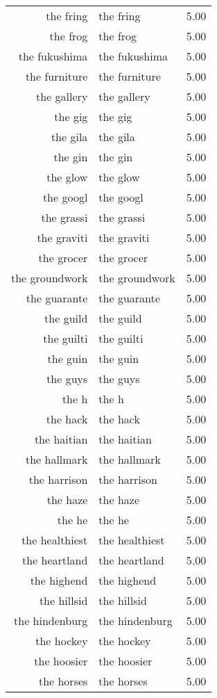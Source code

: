 \begin{table}[ht]
\begin{tabular}{rlr}
  the fring & the fring & 5.00 \\ 
  the frog & the frog & 5.00 \\ 
  the fukushima & the fukushima & 5.00 \\ 
  the furniture & the furniture & 5.00 \\ 
  the gallery & the gallery & 5.00 \\ 
  the gig & the gig & 5.00 \\ 
  the gila & the gila & 5.00 \\ 
  the gin & the gin & 5.00 \\ 
  the glow & the glow & 5.00 \\ 
  the googl & the googl & 5.00 \\ 
  the grassi & the grassi & 5.00 \\ 
  the graviti & the graviti & 5.00 \\ 
  the grocer & the grocer & 5.00 \\ 
  the groundwork & the groundwork & 5.00 \\ 
  the guarante & the guarante & 5.00 \\ 
  the guild & the guild & 5.00 \\ 
  the guilti & the guilti & 5.00 \\ 
  the guin & the guin & 5.00 \\ 
  the guys & the guys & 5.00 \\ 
  the h & the h & 5.00 \\ 
  the hack & the hack & 5.00 \\ 
  the haitian & the haitian & 5.00 \\ 
  the hallmark & the hallmark & 5.00 \\ 
  the harrison & the harrison & 5.00 \\ 
  the haze & the haze & 5.00 \\ 
  the he & the he & 5.00 \\ 
  the healthiest & the healthiest & 5.00 \\ 
  the heartland & the heartland & 5.00 \\ 
  the highend & the highend & 5.00 \\ 
  the hillsid & the hillsid & 5.00 \\ 
  the hindenburg & the hindenburg & 5.00 \\ 
  the hockey & the hockey & 5.00 \\ 
  the hoosier & the hoosier & 5.00 \\ 
  the horses & the horses & 5.00 \\ 

\end{tabular}
\end{table}
